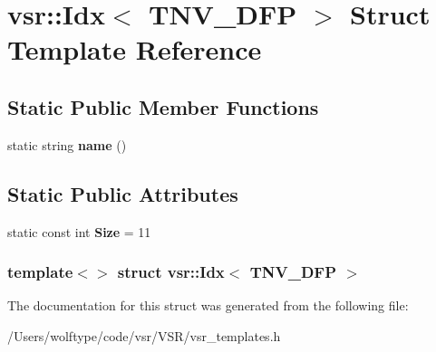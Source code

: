 \hypertarget{structvsr_1_1_idx_3_01_t_n_v___d_f_p_01_4}{\section{vsr\-:\-:Idx$<$ T\-N\-V\-\_\-\-D\-F\-P $>$ Struct Template Reference}
\label{structvsr_1_1_idx_3_01_t_n_v___d_f_p_01_4}
}
\subsection*{Static Public Member Functions}
\begin{DoxyCompactItemize}
\item 
\hypertarget{structvsr_1_1_idx_3_01_t_n_v___d_f_p_01_4_a5954c2064e6fb9a152f75ec4d131ac6a}{static string {\bfseries name} ()}\label{structvsr_1_1_idx_3_01_t_n_v___d_f_p_01_4_a5954c2064e6fb9a152f75ec4d131ac6a}

\end{DoxyCompactItemize}
\subsection*{Static Public Attributes}
\begin{DoxyCompactItemize}
\item 
\hypertarget{structvsr_1_1_idx_3_01_t_n_v___d_f_p_01_4_a7cc4610808854289bd0e3f5632c517f7}{static const int {\bfseries Size} = 11}\label{structvsr_1_1_idx_3_01_t_n_v___d_f_p_01_4_a7cc4610808854289bd0e3f5632c517f7}

\end{DoxyCompactItemize}
\subsubsection*{template$<$$>$ struct vsr\-::\-Idx$<$ T\-N\-V\-\_\-\-D\-F\-P $>$}



The documentation for this struct was generated from the following file\-:\begin{DoxyCompactItemize}
\item 
/\-Users/wolftype/code/vsr/\-V\-S\-R/vsr\-\_\-templates.\-h\end{DoxyCompactItemize}
